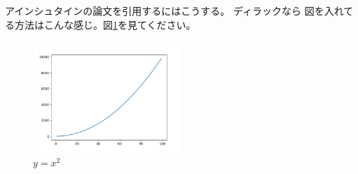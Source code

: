 アインシュタインの論文を引用するにはこうする。\cite{einstein}
ディラックなら \cite{dirac}
図を入れてる方法はこんな感じ。図\ref{fig:sample}を見てください。

\begin{figure}
  \centering
  \includegraphics[width=0.5\textwidth]{figures/sample.png}
  \caption{$y=x^2$}
  \label{fig:sample}
\end{figure}